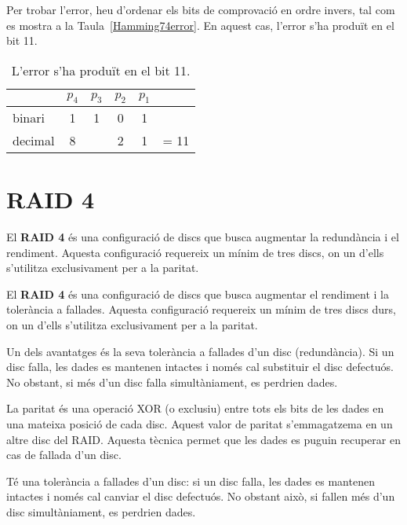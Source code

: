 Per trobar l'error, heu d'ordenar els bits de comprovació en ordre invers, tal com es mostra a la Taula~\ref{Hamming74error}. En aquest cas, l'error s'ha produït en el bit 11. 

\begin{table}[!htb]
\footnotesize
\centering
\begin{tabular}{|l|c|c|c|c|c|}\cline{2-5}
\multicolumn{1}{c|}{}&$p_4$&$p_3$&$p_2$&$p_1$&\multicolumn{1}{c}{} \\ \hline
binari&1&1&0&1&\\ \cline{1-6}
decimal&8&&2&1&= 11\\  \hline
\end{tabular}
\caption{L'error s'ha produït en el bit 11.}
\label{bitscomprovacio}
\end{table}


\section{RAID 4}\label{raid-4}

El \textbf{RAID 4} és una configuració de discs que busca augmentar la redundància i el rendiment. Aquesta configuració requereix un mínim de tres discs, on un d'ells s'utilitza exclusivament per a la paritat.

El \textbf{RAID 4}  és una configuració de discs que busca augmentar el rendiment i la tolerància a fallades. Aquesta configuració requereix un mínim de tres discs durs, on un d'ells s'utilitza exclusivament per a la paritat. %

Un dels avantatges és la seva tolerància a fallades d'un disc (redundància). Si un disc falla, les dades es mantenen intactes i només cal substituir el disc defectuós. No obstant, si més d'un disc falla simultàniament, es perdrien dades.

La paritat és una operació XOR (o exclusiu) entre tots els bits de les dades en una mateixa posició de cada disc. Aquest valor de paritat s'emmagatzema en un altre disc del RAID. Aquesta tècnica permet que les dades es puguin recuperar en cas de fallada d'un disc.

\begin{info}
Té una tolerància a fallades d'un disc: si un disc falla, les dades es mantenen intactes i només cal canviar el disc defectuós. No obstant això, si fallen més d'un disc simultàniament, es perdrien dades.
\end{info}


